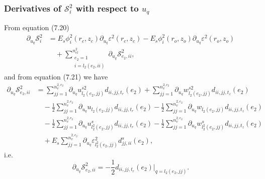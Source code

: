 \documentclass{article}
\begin{document}
\subsubsection{Derivatives of $\mathcal{S}_i^2$ with respect to $u_q$} %
From equation (7.20)
\begin{align}
\partial_{u_q} \mathcal{S}_i^2 &= E_s \phi_i^2(r_c,z_c) \partial_{u_q} \varepsilon^2(r_c,z_c) - E_s \phi_i^2(r_o,z_o) \partial_{u_q} \varepsilon^2(r_o,z_o) \nonumber\\
&\quad + \sum_{\substack{e_2=1\\ i=l_2(e_2,ii)}}^{n_{el}^2} \partial_{u_q} \mathcal{S}_{e_2,ii}^2, \tag{7.24}
\end{align}
and from equation (7.21) we have
\begin{align}
\partial_{u_q} \mathcal{S}_{e_2,ii}^2 &= \sum_{jj=1}^{n_v^{2,e_2}} \partial_{u_q} u_{l_2(e_2,jj)}^{s2} d_{ii,jj,t_r}(e_2) + \sum_{jj=1}^{n_v^{2,e_2}} \partial_{u_q} w_{l_2(e_2,jj)}^{s2} d_{ii,jj,t_z}(e_2) \nonumber\\
&\quad - \frac{1}{2} \sum_{jj=1}^{n_v^{2,e_2}} \partial_{u_q} u_{l_2(e_2,jj)} d_{ii,jj,t_r}(e_2) - \frac{1}{2} \sum_{jj=1}^{n_v^{2,e_2}} \partial_{u_q} w_{l_2(e_2,jj)} d_{ii,jj,t_z}(e_2) \nonumber\\
&\quad - \frac{1}{2} \sum_{jj=1}^{n_v^{2,e_2}} \partial_{u_q} u_{l_2^2(e_2,jj)}^s d_{ii,jj,t_r}(e_2) - \frac{1}{2} \sum_{jj=1}^{n_v^{2,e_2}} \partial_{u_q} w_{l_2^2(e_2,jj)}^s d_{ii,jj,t_z}(e_2) \nonumber\\
&\quad + E_s \sum_{jj=1}^{n_v^{2,e_2}} \partial_{u_q} \varepsilon_{l_2^2(e_2,jj)}^2 d_{jj,ii}^s(e_2), \tag{7.25}
\end{align}
i.e.
\begin{equation}
\partial_{u_q} \mathcal{S}_{e_2,ii}^2 = -\frac{1}{2} d_{ii,jj,t_r}(e_2) \big|_{q=l_2(e_2,jj)}. \tag{7.26}
\end{equation}
\end{document}
